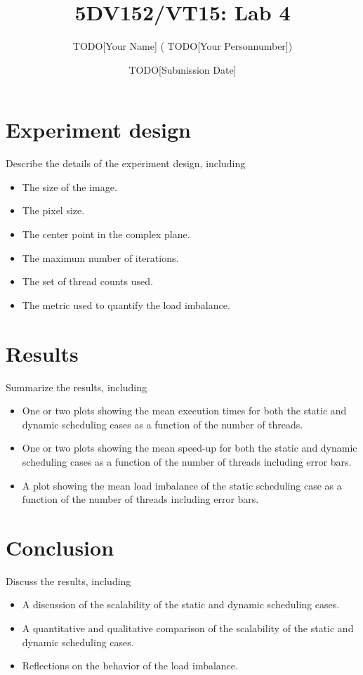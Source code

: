 \documentclass[a4paper,12pt]{article}
\newcommand{\todo}[1]{{\color{blue} TODO[#1]}}
\begin{document}
\title{5DV152/VT15: Lab 4}
\author{\todo{Your Name} (\todo{Your Personnumber})}
\date{\todo{Submission Date}}
\maketitle


\section{Experiment design}
\label{sec:experiment-design}

Describe the details of the experiment design, including
\begin{itemize}
\item The size of the image.
\item The pixel size.
\item The center point in the complex plane.
\item The maximum number of iterations.
\item The set of thread counts used.
\item The metric used to quantify the load imbalance.
\end{itemize}

\section{Results}
\label{sec:results}

Summarize the results, including
\begin{itemize}
\item One or two plots showing the mean execution times for both the static and dynamic scheduling cases as a function of the number of threads.
\item One or two plots showing the mean speed-up for both the static and dynamic scheduling cases as a function of the number of threads including error bars.
\item A plot showing the mean load imbalance of the static scheduling case as a function of the number of threads including error bars.
\end{itemize}

\section{Conclusion}
\label{sec:conclusion}

Discuss the results, including
\begin{itemize}
\item A discussion of the scalability of the static and dynamic scheduling cases.
\item A quantitative and qualitative comparison of the scalability of the static and dynamic scheduling cases.
\item Reflections on the behavior of the load imbalance.
\end{itemize}
  
\end{document}
